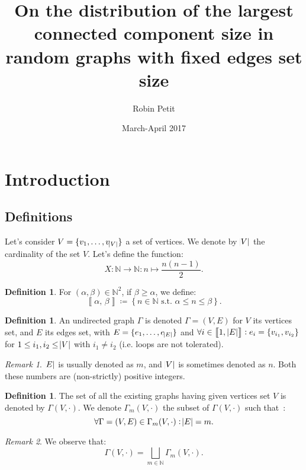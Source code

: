\documentclass{article}
\author{Robin Petit}
\date{March-April 2017}
\title{On the distribution of the largest connected component size in random graphs with fixed edges set size}
\theoremstyle{definition}
\newtheorem{definition}[lemma]{Definition}
\theoremstyle{remark}
\newtheorem*{remark}{Remark}
\newcommand{\N}{\mathbb N}
\newcommand{\intint}[2]{\left\llbracket#1, \, #2\right\rrbracket}
\newcommand{\st}{\text{ s.t. }}
\begin{document}
\maketitle
\tableofcontents
\newpage
{}
\setcounter{page}{1}

\section{Introduction}
	\subsection{Definitions}
		Let's consider $V = \{v_1, \ldots, v_{\abs V}\}$ a set of vertices. We denote by $\abs V$ the cardinality of the set $V$. Let's define
		the function:
		\[X : \N \to \N : n \mapsto \frac {n(n-1)}2.\]

		\begin{definition} For $(\alpha, \beta) \in \N^2$, if $\beta \geq \alpha$, we define:
		\[\intint \alpha\beta \coloneqq \left\{n \in \N \st \alpha \leq n \leq \beta\right\}.\]
		\end{definition}

		\begin{definition} An undirected graph $\Gamma$ is denoted $\Gamma = (V, E)$ for $V$ its vertices set, and $E$ its edges set, with $E = \{e_1, \ldots, e_{\abs E}\}$
		and $\forall i \in \intint 1{\abs E} : e_i = \{v_{i_1}, v_{i_2}\}$ for $1 \leq i_1, i_2 \leq \abs V$ with $i_1 \neq i_2$ (i.e. loops are not tolerated).
		\end{definition}

		\begin{remark} $\abs E$ is usually denoted as $m$, and $\abs V$ is sometimes denoted as $n$. Both these numbers are (non-strictly) positive integers.
		\end{remark}

		\begin{definition} The set of all the existing graphs having given vertices set $V$ is denoted by $\Gamma(V, \cdot)$. We denote $\Gamma_m(V, \cdot)$
		the subset of $\Gamma(V, \cdot)$ such that~:
		\[\forall \Gamma = (V, E) \in \Gamma_m(V, \cdot) : \abs E = m.\]
		\end{definition}

		\begin{remark} We observe that:
		\[\Gamma(V, \cdot) = \bigsqcup_{m \in \N}\Gamma_m(V, \cdot).\]
		\end{remark}
\end{document}
